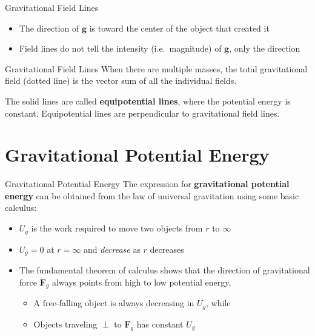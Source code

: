 \documentclass[12pt,compress,aspectratio=169]{beamer}
\begin{document}
\begin{frame}{Gravitational Field Lines}
  \begin{center}
  \end{center}
  \begin{itemize}
  \item The direction of $\bm{g}$ is toward the center of the object that
    created it
  \item Field lines do not tell the intensity (i.e.\ magnitude) of $\bm{g}$,
    only the direction
  \end{itemize}
\end{frame}



\begin{frame}{Gravitational Field Lines}
  When there are multiple masses, the total gravitational field (dotted line)
  is the vector sum of all the individual fields.
  \begin{center}
  \end{center}
  The solid lines are called \textbf{equipotential lines}, where the potential
  energy is constant. Equipotential lines are perpendicular to
  gravitational field lines.
\end{frame}



\section{Gravitational Potential Energy}

\begin{frame}{Gravitational Potential Energy}
  The expression for \textbf{gravitational potential energy} can be obtained
  from the law of universal gravitation using some basic calculus:

  \begin{itemize}
  \item $U_g$ is the work required to move two objects from $r$ to $\infty$
  \item $U_g=0$ at $r=\infty$ and \emph{decrease} as $r$ decreases
  \item The fundamental theorem of calculus shows that the direction of
    gravitational force $\bm{F}_g$ always points from high to low potential
    energy,
    \begin{itemize}
    \item A free-falling object is always decreasing in $U_g$, while
    \item Objects traveling $\perp$ to $\bm{F}_g$ has constant $U_g$
    \end{itemize}
  \end{itemize}
\end{frame}
\end{document}

